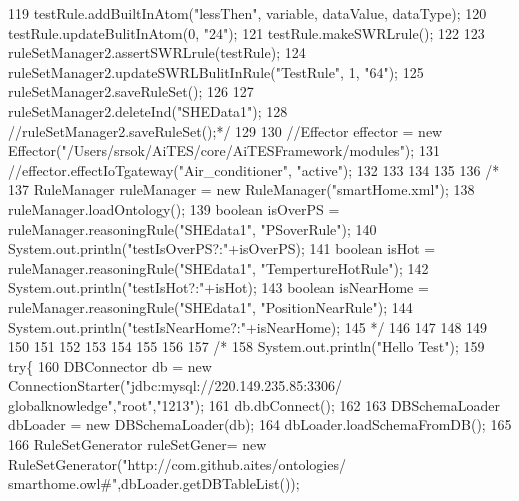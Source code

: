 \begin{DoxyCode}
119 \textcolor{comment}{        testRule.addBuiltInAtom("lessThen", variable, dataValue, dataType);}
120 \textcolor{comment}{        testRule.updateBulitInAtom(0, "24");}
121 \textcolor{comment}{        testRule.makeSWRLrule();}
122 \textcolor{comment}{        }
123 \textcolor{comment}{        ruleSetManager2.assertSWRLrule(testRule);}
124 \textcolor{comment}{        ruleSetManager2.updateSWRLBulitInRule("TestRule", 1, "64");}
125 \textcolor{comment}{        ruleSetManager2.saveRuleSet();}
126 \textcolor{comment}{        }
127 \textcolor{comment}{        ruleSetManager2.deleteInd("SHEData1");}
128 \textcolor{comment}{        //ruleSetManager2.saveRuleSet();*/}
129         
130         \textcolor{comment}{//Effector effector = new Effector("/Users/srsok/AiTES/core/AiTESFramework/modules");}
131         \textcolor{comment}{//effector.effectIoTgateway("Air\_conditioner", "active");}
132         
133         
134         
135         
136         \textcolor{comment}{/*}
137 \textcolor{comment}{        RuleManager ruleManager = new RuleManager("smartHome.xml");}
138 \textcolor{comment}{        ruleManager.loadOntology(); }
139 \textcolor{comment}{        boolean isOverPS = ruleManager.reasoningRule("SHEdata1", "PSoverRule");}
140 \textcolor{comment}{        System.out.println("testIsOverPS?:"+isOverPS);}
141 \textcolor{comment}{        boolean isHot = ruleManager.reasoningRule("SHEdata1", "TempertureHotRule");}
142 \textcolor{comment}{        System.out.println("testIsHot?:"+isHot);}
143 \textcolor{comment}{        boolean isNearHome = ruleManager.reasoningRule("SHEdata1", "PositionNearRule");}
144 \textcolor{comment}{        System.out.println("testIsNearHome?:"+isNearHome);}
145 \textcolor{comment}{        */}
146         
147         
148         
149         
150         
151         
152         
153         
154         
155         
156         
157         \textcolor{comment}{/*}
158 \textcolor{comment}{        System.out.println("Hello Test");}
159 \textcolor{comment}{        try\{}
160 \textcolor{comment}{              DBConnector db = new ConnectionStarter("jdbc:mysql://220.149.235.85:3306/
      globalknowledge","root","1213");}
161 \textcolor{comment}{              db.dbConnect();}
162 \textcolor{comment}{            }
163 \textcolor{comment}{              DBSchemaLoader dbLoader = new DBSchemaLoader(db);}
164 \textcolor{comment}{              dbLoader.loadSchemaFromDB();}
165 \textcolor{comment}{    }
166 \textcolor{comment}{              RuleSetGenerator ruleSetGener= new RuleSetGenerator("http://com.github.aites/ontologies/
      smarthome.owl#",dbLoader.getDBTableList());}

\end{DoxyCode}
